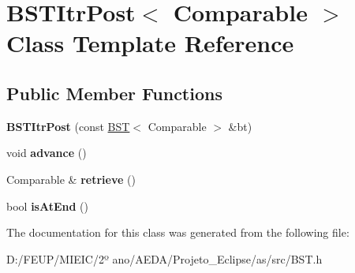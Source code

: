 \hypertarget{class_b_s_t_itr_post}{}\section{B\+S\+T\+Itr\+Post$<$ Comparable $>$ Class Template Reference}
\label{class_b_s_t_itr_post}
\subsection*{Public Member Functions}
\begin{DoxyCompactItemize}
\item 
\mbox{\label{class_b_s_t_itr_post_acf7e537dea01978f40c40909c55c56c2}} 
{\bfseries B\+S\+T\+Itr\+Post} (const \hyperlink{class_b_s_t}{B\+ST}$<$ Comparable $>$ \&bt)
\item 
\mbox{\label{class_b_s_t_itr_post_a376098e5a82cd02118dd4dcdec49bb26}} 
void {\bfseries advance} ()
\item 
\mbox{\label{class_b_s_t_itr_post_a72446e4d0df0bcafc14294a78faeb56e}} 
Comparable \& {\bfseries retrieve} ()
\item 
\mbox{\label{class_b_s_t_itr_post_a2f330e73bb817e8bd1c797805e66ddb7}} 
bool {\bfseries is\+At\+End} ()
\end{DoxyCompactItemize}


The documentation for this class was generated from the following file\+:\begin{DoxyCompactItemize}
\item 
D\+:/\+F\+E\+U\+P/\+M\+I\+E\+I\+C/2º ano/\+A\+E\+D\+A/\+Projeto\+\_\+\+Eclipse/as/src/B\+S\+T.\+h\end{DoxyCompactItemize}
